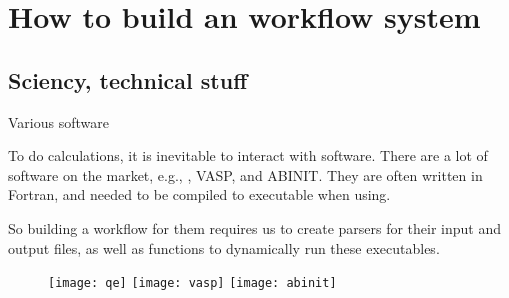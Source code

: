 \section{How to build an \ab{} workflow system}

\subsection{Sciency, technical stuff}

\begin{frame}{Various \ab{} software}

    To do \ab{} calculations, it is inevitable to interact with \ab{} software.
    There are a lot of software on the market, e.g., \qe{}, VASP, and ABINIT.
    They are often written in Fortran, and needed to be compiled to executable
    when using.

    So building a workflow for them requires us to create parsers for their input and output
    files, as well as functions to dynamically run these executables.

    \begin{figure}[b]
        \centering
        \texttt{[image: qe]}
        \hfill
        \texttt{[image: vasp]}
        \hfill
        \texttt{[image: abinit]}
        \label{fig:abinitsoftware}
    \end{figure}

\end{frame}

